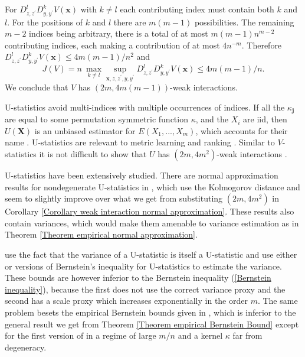 \documentclass[final,12pt]{colt2018} %
\begin{document}
			For $D_{z,z^{\prime }}^{l}D_{y,y^{\prime }}^{k}V\left( \mathbf{x}\right) $
			with $k\neq l$ each contributing index must contain both $k$ and $l$. For
			the positions of $k$ and $l$ there are $m\left( m-1\right) $ possibilities.
			The remaining $m-2$ indices being arbitrary, there is a total of at most $%
			m\left( m-1\right) n^{m-2}$ contributing indices, each making a contribution
			of at most $4n^{-m}$. Therefore $D_{z,z^{\prime }}^{l}D_{y,y^{\prime
				}}^{k}V\left( \mathbf{x}\right) \leq 4m\left( m-1\right) /n^{2}$ and%
				\begin{equation*}
				J\left( V\right) =n~\max_{k\neq l}\sup_{\mathbf{x},z,z^{\prime },y,y^{\prime
					}}D_{z,z^{\prime }}^{l}D_{y,y^{\prime }}^{k}V\left( \mathbf{x}\right) \leq
					4m\left( m-1\right) /n. 
					\end{equation*}%
					We conclude that $V$ has $\left( 2m,4m\left( m-1\right) \right) $-weak
					interactions.
					
					U-statistics avoid multi-indices with multiple occurrences of indices. If
					all the $\kappa _{\mathbf{j}}$ are equal to some permutation symmetric
					function $\kappa $, and the $X_{i}$ are iid, then $U\left( \mathbf{X}\right) 
					$ is an unbiased estimator for $E\left( X_{1},...,X_{m}\right) $, which
					accounts for their name \citep{Hoeffding 1948}. U-statistics are relevant to
					metric learning \citep{Cao 2016} and ranking \citep{Clemencon 2008}. Similar
					to $V$-statistics it is not difficult to show that $U$ has $\left(
					2m,4m^{2}\right) $-weak interactions \citep[see][]{Maurer 2017}.
					
					U-statistics have been extensively studied. There are normal approximation
					results for nondegenerate U-statistics in \cite{Chen 2010}, which
					use the Kolmogorov distance and seem to slightly improve over what we get
					from substituting $\left( 2m,4m^{2}\right) $ in Corollary \ref{Corollary
						weak interaction normal approximation}. These results also contain
					variances, which would make them amenable to variance estimation as in
					Theorem \ref{Theorem empirical normal approximation}.
					
					\citet{Peel 2010} use the fact that the variance of a U-statistic
					is itself a U-statistic and use either \citet{Hoeffding 1948} or
					\citet{Arcones 1995} versions of Bernstein's inequality for
					U-statistics to estimate the variance. These bounds are however inferior to
					the Bernstein inequality (\ref{Bernstein inequality}), because the first
					does not use the correct variance proxy and the second has a scale proxy
					which increases exponentially in the order $m$. The same problem besets the
					empirical Bernstein bounds given in \citep{Peel 2010}, which is inferior to
					the general result we get from Theorem \ref{Theorem empirical Bernstein
						Bound} except for the first version of \citet{Peel 2010} in a regime of large 
					$m/n$ and a kernel $\kappa $ far from degeneracy.
					
\end{document}

